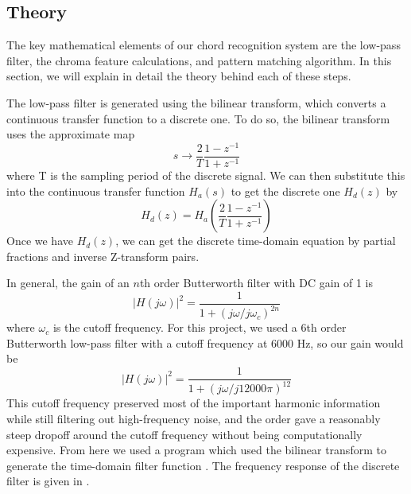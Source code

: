 \documentclass[journal]{IEEEtran}
\begin{document}
\subsection{Theory}
The key mathematical elements of our chord recognition system are the low-pass filter, the chroma feature calculations, and pattern matching algorithm.
In this section, we will explain in detail the theory behind each of these steps.

The low-pass filter is generated using the bilinear transform, which converts a continuous transfer function to a discrete one.
To do so, the bilinear transform uses the approximate map
\begin{equation}
    s \to \frac{2}{T}\frac{1 - z^{-1}}{1 + z^{-1}}
    \label{eq:s_to_z}
\end{equation}
where T is the sampling period of the discrete signal.
We can then substitute this into the continuous transfer function $H_a(s)$ to get the discrete one $H_d(z)$ by 
\begin{equation}
    H_d(z) = H_a\!\left(\frac{2}{T}\frac{1 - z^{-1}}{1 + z^{-1}}\right)
    \label{eq:bilinear}
\end{equation}
Once we have $H_d(z)$, we can get the discrete time-domain equation by partial fractions and inverse Z-transform pairs.

In general, the gain of an $n$th order Butterworth filter with DC gain of 1 is 
\begin{equation}
    |H(j\omega)|^2 = \frac{1}{1 + (j\omega/j\omega_c)^{2n}}
    \label{eq:butterworth}
\end{equation}
where $\omega_c$ is the cutoff frequency.
For this project, we used a 6th order Butterworth low-pass filter with a cutoff frequency at 6000 Hz, so our gain would be
\begin{equation*}
    |H(j\omega)|^2 = \frac{1}{1 + (j\omega/j12000\pi)^{12}}
    \label{eq:our_butterworth}
\end{equation*}
This cutoff frequency preserved most of the important harmonic information while still filtering out high-frequency noise, and the order gave a reasonably steep dropoff around the cutoff frequency without being computationally expensive.
From here we used a program which used the bilinear transform to generate the time-domain filter function \cite{filter}.
The frequency response of the discrete filter is given in .
\end{document}
